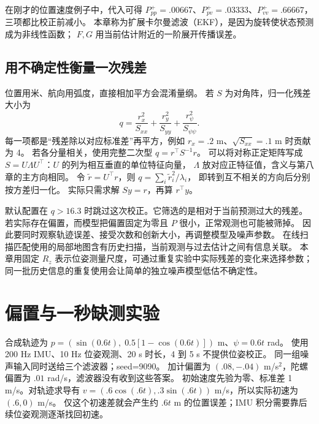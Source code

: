 
在刚才的位置速度例子中，代入可得
$P^+_{pp}=.00667$、$P^+_{pv}=.03333$、$P^+_{vv}=.66667$，三项都比校正前减小。
本章称为扩展卡尔曼滤波（EKF），是因为旋转使状态预测成为非线性函数；
$F,G$ 用当前估计附近的一阶展开传播误差。

\subsection{用不确定性衡量一次残差}
位置用米、航向用弧度，直接相加平方会混淆量纲。
若 $S$ 为对角阵，归一化残差大小为
\begin{equation}
q=\frac{r_x^2}{S_{xx}}+\frac{r_y^2}{S_{yy}}+\frac{r_\psi^2}{S_{\psi\psi}}.
\end{equation}
每一项都是“残差除以对应标准差”再平方，例如 $r_x=.2$ m、$\sqrt{S_{xx}}=.1$ m 时贡献为 4。
若各分量相关，使用完整二次型 $q=r^\top S^{-1}r$。
可以将对称正定矩阵写成 $S=U\Lambda U^\top$：$U$ 的列为相互垂直的单位特征向量，
$\Lambda$ 放对应正特征值，含义与第八章的主方向相同。
令 $\tilde r=U^\top r$，则 $q=\sum_i\tilde r_i^2/\lambda_i$，
即转到互不相关的方向后分别按方差归一化。
实际只需求解 $Sy=r$，再算 $r^\top y$。

默认配置在 $q>16.3$ 时跳过这次校正。它筛选的是相对于当前预测过大的残差。
若实际存在偏置，而模型把偏置固定为零且 $P$ 很小，正常观测也可能被筛掉。
因此要同时观察轨迹误差、接受次数和创新大小，再调整模型及噪声参数。
在线扫描匹配使用的局部地图含有历史扫描，当前观测与过去估计之间有信息关联。
本章用固定 $R_z$ 表示位姿测量尺度，可通过重复实验中实际残差的变化来选择参数；
同一批历史信息的重复使用会让简单的独立噪声模型低估不确定性。

\section{偏置与一秒缺测实验}
合成轨迹为 $p=(\sin(0.6t),\;0.5[1-\cos(0.6t)])$ m、$\psi=0.6t$ rad。
使用 200 Hz IMU、10 Hz 位姿观测、20 s 时长，4 到 5 s 不提供位姿校正。
同一组噪声输入同时送给三个滤波器；seed=9090。
加计偏置为 $(.08,-.04)$ m/s$^2$，陀螺偏置为 $.01$ rad/s，滤波器没有收到这些答案。
初始速度先验为零、标准差 1 m/s。对轨迹求导有
$v=(.6\cos(.6t),.3\sin(.6t))$ m/s，所以实际初速为 $(.6,0)$ m/s。
仅这个初速差就会产生约 $.6t$ m 的位置误差；IMU 积分需要靠后续位姿观测逐渐找回初速。

